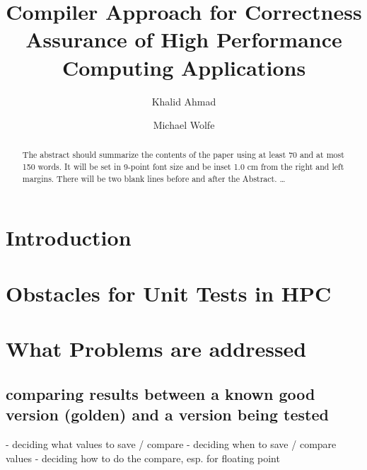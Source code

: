 \documentclass{llncs}
\begin{document}
\title{Compiler Approach for Correctness Assurance of High Performance Computing Applications}
%
%
\author{Khalid Ahmad \and Michael Wolfe}
%
%
%

\maketitle              %

\begin{abstract}
The abstract should summarize the contents of the paper
using at least 70 and at most 150 words. It will be set in 9-point
font size and be inset 1.0 cm from the right and left margins.
There will be two blank lines before and after the Abstract. \dots
{}
\end{abstract}
%



\section{Introduction}
%


\section{Obstacles for Unit Tests in HPC}

\section {What Problems are addressed}
\subsection{comparing results between a known good version (golden) and a version being tested}
  - deciding what values to save / compare
  - deciding when to save / compare values
  - deciding how to do the compare, esp. for floating point
\end{document}
